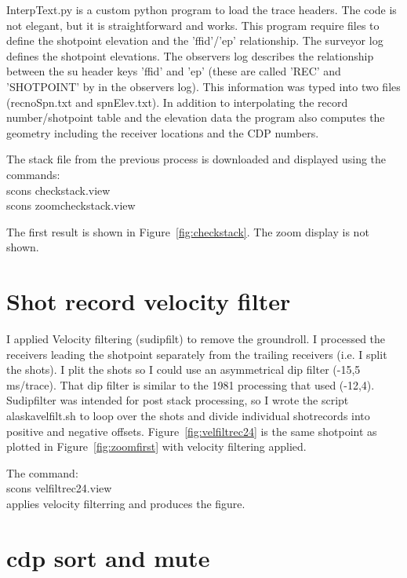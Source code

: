 InterpText.py is a custom python program to load the trace headers.  The
code is not elegant, but it is straightforward and works.  This program 
require files to define the shotpoint elevation and the 'ffid'/'ep' 
relationship.  The surveyor log defines the shotpoint elevations.  The 
observers log describes the relationship between the su header keys 
'ffid' and 'ep' (these are called 'REC' and 'SHOTPOINT' by in the observers 
log).  This information was typed into two files (recnoSpn.txt and 
spnElev.txt).  In addition to interpolating the record number/shotpoint 
table and the elevation data the program also computes the geometry 
including the receiver locations and the CDP numbers.

The stack file from the previous process is downloaded and displayed 
using the commands: \\
scons checkstack.view \\
scons zoomcheckstack.view

The first result is shown in Figure~\ref{fig:checkstack}.  The zoom display
is not shown.


\section{Shot record velocity filter}
I applied Velocity filtering (sudipfilt) to remove the groundroll.
I processed the receivers leading the shotpoint separately from the
trailing receivers (i.e. I split the shots).  I plit the shots so I 
could use an asymmetrical dip filter (-15,5 ms/trace).  That dip filter 
is similar to the 1981 processing that used (-12,4). Sudipfilter was 
intended for post stack processing, so I wrote the script alaskavelfilt.sh 
to loop over the shots and divide individual shotrecords into positive 
and negative offsets.  Figure~\ref{fig:velfiltrec24} is the same shotpoint 
as plotted in Figure~\ref{fig:zoomfirst} with velocity filtering applied.

The command:\\
scons velfiltrec24.view \\
applies velocity filterring and produces the figure.


\section{cdp sort and mute}

